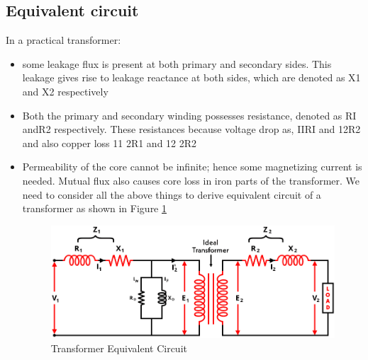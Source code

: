\documentclass[12pt,fleqn]{book} %
\begin{document}
\subsection{Equivalent circuit}
In a practical transformer:
\begin{itemize}
    \item some leakage flux is present at both primary and secondary sides. This leakage gives rise to leakage reactance at both sides, which are denoted as X1 and X2 respectively
    \item Both the primary and secondary winding possesses resistance, denoted as RI andR2 respectively. These resistances because voltage drop as, IIRI and 12R2 and also copper loss 11 2R1 and 12 2R2
    \item Permeability of the core cannot be infinite; hence some magnetizing current is needed. Mutual flux also causes core loss in iron parts of the transformer. We need to consider all the above things to derive equivalent circuit of a transformer as shown in Figure \ref{fig:hamdy 7}
    \begin{figure}[h!]
    \centering
    \includegraphics[width=0.8\linewidth]{hamdy 7.png}
    \caption{Transformer Equivalent Circuit }
    \label{fig:hamdy 7}
\end{figure}
\end{itemize}
\end{document}
